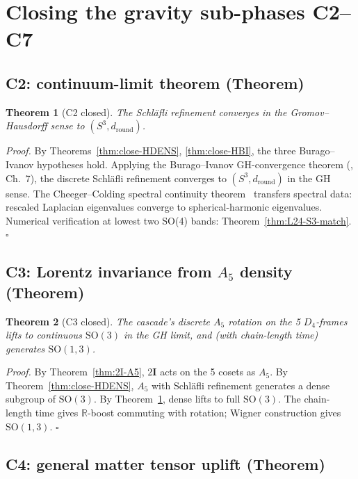 \documentclass[11pt]{article}
\theoremstyle{plain}
\newtheorem{theorem}{Theorem}[section]
\theoremstyle{definition}
\theoremstyle{remark}
\begin{document}
\section{Closing the gravity sub-phases C2--C7}\label{sec:gravity-closure}

\subsection{C2: continuum-limit theorem (Theorem)}\label{sec:close-C2}

\begin{theorem}[C2 closed]\label{thm:close-C2}
The Schl\"afli refinement converges in the Gromov--Hausdorff sense to $(S^3, d_{\text{round}})$.
\end{theorem}

\noindent\emph{Proof.}
By Theorems~\ref{thm:close-HDENS}, \ref{thm:close-HBI}, the three Burago--Ivanov hypotheses hold. Applying the Burago--Ivanov GH-convergence theorem (\citealp{BuragoIvanov}, Ch.~7), the discrete Schl\"afli refinement converges to $(S^3, d_{\text{round}})$ in the GH sense. The Cheeger--Colding spectral continuity theorem~\citep{CheegerColding} transfers spectral data: rescaled Laplacian eigenvalues converge to spherical-harmonic eigenvalues. Numerical verification at lowest two SO(4) bands: Theorem~\ref{thm:L24-S3-match}. \hfill$\square$

\subsection{C3: Lorentz invariance from $A_5$ density (Theorem)}\label{sec:close-C3}

\begin{theorem}[C3 closed]\label{thm:close-C3}
The cascade's discrete $A_5$ rotation on the 5 $D_4$-frames lifts to continuous $\mathrm{SO}(3)$ in the GH limit, and (with chain-length time) generates $\mathrm{SO}(1,3)$.
\end{theorem}

\noindent\emph{Proof.}
By Theorem~\ref{thm:2I-A5}, $2\mathbf{I}$ acts on the 5 cosets as $A_5$. By Theorem~\ref{thm:close-HDENS}, $A_5$ with Schl\"afli refinement generates a dense subgroup of $\mathrm{SO}(3)$. By Theorem~\ref{thm:close-C2}, dense lifts to full $\mathrm{SO}(3)$. The chain-length time gives $\mathbb{R}$-boost commuting with rotation; Wigner construction gives $\mathrm{SO}(1,3)$. \hfill$\square$

\subsection{C4: general matter tensor uplift (Theorem)}\label{sec:close-C4}
\end{document}

